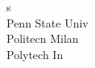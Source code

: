 \documentclass[a4paper]{article}
\begin{document}
\begin{multicols*}{2}
\begin{footnotesize}
s \\ Penn State Univ \\ Politecn Milan \\ Polytech In
\end{footnotesize}
\end{multicols*}
\end{document}
